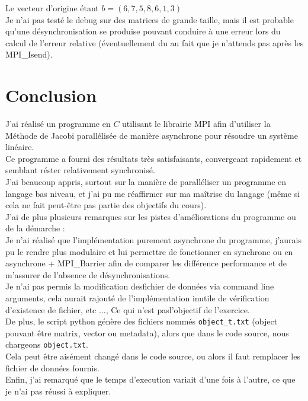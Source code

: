 \documentclass[11pt, a4paper]{article}
\begin{document}
Le vecteur d'origine étant $b = (6,7,5,8,6,1,3)$\\

Je n'ai pas testé le debug sur des matrices de grande taille, mais il est probable qu'une désynchronisation se produise pouvant conduire à une erreur lors du calcul de l'erreur relative (éventuellement du au fait que je n'attends pas après les MPI\_Isend).

\newpage

\section{Conclusion}

J'ai réalisé un programme en $C$ utilisant le librairie MPI afin d'utiliser la Méthode de Jacobi parallélisée de manière asynchrone pour résoudre un système linéaire.\\

Ce programme a fourni des résultats très satisfaisants, convergeant rapidement et semblant réster relativement synchronisé.\\

J'ai beaucoup appris, surtout sur la manière de paralléliser un programme en langage bas niveau, et j'ai pu me réaffirmer sur ma ma\^itrise du langage (m\^eme si cela ne fait peut-\^etre pas partie des objectifs du cours).\\

J'ai de plus plusieurs remarques sur les pistes d'améliorations du programme ou de la démarche :\\

Je n'ai réalisé que l'implémentation purement asynchrone du programme, j'aurais pu le rendre plus modulaire et lui permettre de fonctionner en synchrone ou en asynchrone + MPI\_Barrier afin de comparer les différence performance et de m'assurer de l'absence de désynchronisations.\\

Je n'ai pas permis la modification desfichier de données via command line arguments, cela aurait rajouté de l'implémentation inutile de vérification d'existence de fichier, etc ..., Ce qui n'est pasl'objectif de l'exercice.\\
De plus, le script python génère des fichiers nommés \texttt{object\_t.txt} (object pouvant \^etre matrix, vector ou metadata), alors que dans le code source, nous chargeons \texttt{object.txt}.\\
Cela peut \^etre aisément changé dans le code source, ou alors il faut remplacer les fichier de données fournis.\\

Enfin, j'ai remarqué que le temps d'execution variait d'une fois à l'autre, ce que je n'ai pas réussi à expliquer.
\end{document}
